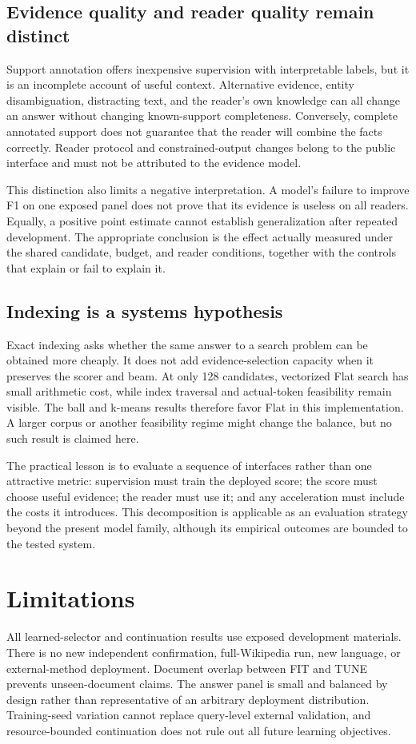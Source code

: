 \documentclass[pdflatex,sn-mathphys-num]{sn-jnl}
\begin{document}
\subsection{Evidence quality and reader quality remain distinct}
Support annotation offers inexpensive supervision with interpretable labels,
but it is an incomplete account of useful context. Alternative evidence,
entity disambiguation, distracting text, and the reader's own knowledge can
all change an answer without changing known-support completeness. Conversely,
complete annotated support does not guarantee that the reader will combine
the facts correctly. Reader protocol and constrained-output changes belong
to the public interface and must not be attributed to the evidence model.

This distinction also limits a negative interpretation. A model's failure
to improve F1 on one exposed panel does not prove that its evidence is
useless on all readers. Equally, a positive point estimate cannot establish
generalization after repeated development. The appropriate conclusion is
the effect actually measured under the shared candidate, budget, and reader
conditions, together with the controls that explain or fail to explain it.

\subsection{Indexing is a systems hypothesis}
Exact indexing asks whether the same answer to a search problem can be
obtained more cheaply. It does not add evidence-selection capacity when it
preserves the scorer and beam. At only 128 candidates, vectorized Flat
search has small arithmetic cost, while index traversal and actual-token
feasibility remain visible. The ball and k-means results therefore favor
Flat in this implementation. A larger corpus or another feasibility regime
might change the balance, but no such result is claimed here.

The practical lesson is to evaluate a sequence of interfaces rather than
one attractive metric: supervision must train the deployed score; the
score must choose useful evidence; the reader must use it; and any
acceleration must include the costs it introduces. This decomposition is
applicable as an evaluation strategy beyond the present model family,
although its empirical outcomes are bounded to the tested system.

\section{Limitations}
All learned-selector and continuation results use exposed development
materials. There is no new independent confirmation, full-Wikipedia run,
new language, or external-method deployment. Document overlap between FIT
and TUNE prevents unseen-document claims. The answer panel is small and
balanced by design rather than representative of an arbitrary deployment
distribution. Training-seed variation cannot replace query-level external
validation, and resource-bounded continuation does not rule out all future
learning objectives.
\end{document}
